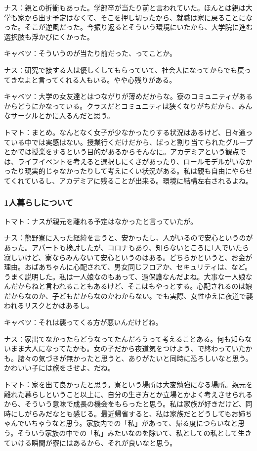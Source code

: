 ナス：親との折衝もあった。学部卒が当たり前と言われていた。ほんとは親は大学も家から出す予定はなくて、そこを押し切ったから、就職は家に戻ることになった。そこが逆風だった。今振り返るとそういう環境にいたから、大学院に進む選択肢も浮かびにくかった。

キャベツ：そういうのが当たり前だった、ってことか。

ナス：研究で接する人は優しくしてもらっていて、社会人になってからでも戻ってきなよと言ってくれる人もいる。やや心残りがある。

キャベツ：大学の女友達とはつながりが薄めだからな。寮のコミュニティがあるからどうにかなっている。クラスだとコミュニティは狭くなりがちだから、みんなサークルとかに入るんだと思う。

トマト：まとめ。なんとなく女子が少なかったりする状況はあるけど、日々通っている中では実感はない。授業行くだけだから、ぱっと割り当てられたグループとかでは授業をするという目的があるからそんなに。アカデミアという観点では、ライフイベントを考えると選択しにくさがあったり、ロールモデルがいなかったり現実的じゃなかったりして考えにくい状況がある。私は親も自由にやらせてくれているし、アカデミアに残ることが出来る。環境に結構左右されるよね。

\subsubsection{1人暮らしについて}
トマト：ナスが親元を離れる予定はなかったと言っていたが。

ナス：熊野寮に入った経緯を言うと、安かったし、人がいるので安心というのがあった。アパートも検討したが、コロナもあり、知らないところに1人でいたら寂しいけど、寮ならみんないて安心というのはある。どちらかというと、お金が理由。おばあちゃんに心配されて、男女同じフロアか、セキュリティは、など。うまく説明した。私は一人娘なのもあって、過保護なんだよね。大事な一人娘なんだからねと言われることもあるけど、そこはもやっとする。心配されるのは娘だからなのか、子どもだからなのかわからない。でも実際、女性ゆえに夜道で襲われるリスクとかはあるし。

キャベツ：それは襲ってくる方が悪いんだけどね。

ナス：家出てなかったらどうなってたんだろうって考えることある。何も知らないまま大人になってたかも。女の子だから夜道気をつけよう、で終わっていたかも。諸々の気づきが無かったと思うと、ありがたいと同時に恐ろしいなと思う。かわいい子には旅をさせよ、だね。

トマト：家を出て良かったと思う。寮という場所は大変勉強になる場所。親元を離れた暮らしということ以上に、自分の生き方とか立場とかよく考えさせられるから、そういう意味で成長の機会をもらったと思う。私は家族が好きだけど、同時にしがらみだなとも感じる。最近帰省すると、私は家族だとどうしてもお姉ちゃんでいちゃうなと思う。家族内での「私」があって、帰る度につらいなと思う。そういう家族の中での「私」みたいなのを除いて、私としての私として生きていける瞬間が寮にはあるから、それが良いなと思う。

